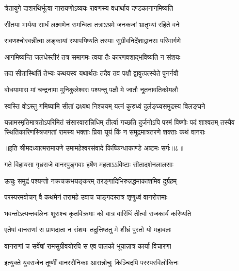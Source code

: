 \twolineshloka
{त्रेतायुगे दाशरथिर्भूत्वा नारायणोऽव्ययः}
{रावणस्य वधार्थाय दण्डकानागमिष्यति} %

\twolineshloka
{सीतया भार्यया सार्धं लक्ष्मणेन समन्वितः}
{तत्राऽश्रमे जनकजां भ्रातृभ्यां रहिते वने} %

\twolineshloka
{रावणश्चोरवन्नीत्वा लङ्कायां स्थापयिष्यति}
{तस्याः सुग्रीवनिर्देशाद्वानराः परिमार्गणे} %

\twolineshloka
{आगमिष्यन्ति जलधेस्तीरं तत्र समागमः}
{त्वया तैः कारणवशाद्भविष्यति न संशयः} %

\twolineshloka
{तदा सीतास्थितिं तेभ्यः कथयस्व यथार्थतः}
{तदैव तव पक्षौ द्वावुत्पत्स्येते पुनर्नवौ} %


\twolineshloka
{बोधयामास मां चन्द्रनामा मुनिकुलेश्वरः}
{पश्यन्तु पक्षौ मे जातौ नूतनावतिकोमलौ} %

\twolineshloka
{स्वस्ति वोऽस्तु गमिष्यामि सीतां द्रक्ष्यथ निश्चयम्}
{यत्नं कुरुध्वं दुर्लङ्घ्यसमुद्रस्य विलङ्घने} %

\fourlineindentedshloka
{यन्नामस्मृतिमात्रतोऽपरिमितं संसारवारान्निधिम्}
{तीर्त्वा गच्छति दुर्जनोऽपि परमं विष्णोः पदं शाश्वतम्}
{तस्यैव स्थितिकारिणस्त्रिजगतां रामस्य भक्ताः प्रिया}
{यूयं किं न समुद्रमात्रतरणे शक्ताः कथं वानराः} %

{॥इति श्रीमदध्यात्मरामायणे उमामहेश्वरसंवादे किष्किन्धाकाण्डे
अष्टमः सर्गः॥८॥}





\twolineshloka
{गते विहायसा गृध्रराजे वानरपुङ्गवाः}
{हर्षेण महताऽऽविष्टाः सीतादर्शनलालसाः} %

\twolineshloka
{ऊचुः समुद्रं पश्यन्तो नक्रचक्रभयङ्करम्}
{तरङ्गादिभिरुन्नद्धमाकाशमिव दुर्ग्रहम्} %

\twolineshloka
{परस्परमवोचन् वै कथमेनं तरामहे}
{उवाच चाङ्गदस्तत्र शृणुध्वं वानरोत्तमाः} %

\twolineshloka
{भवन्तोऽत्यन्तबलिनः शूराश्च कृतविक्रमाः}
{को वात्र वारिधिं तीर्त्वा राजकार्यं करिष्यति} %

\twolineshloka
{एतेषां वानराणां स प्राणदाता न संशयः}
{तदुत्तिष्ठतु मे शीघ्रं पुरतो यो महाबलः} %

\twolineshloka
{वानराणां च सर्वेषां रामसुग्रीवयोरपि}
{स एव पालको भूयान्नात्र कार्या विचारणा} %

\twolineshloka
{इत्युक्ते युवराजेन तूष्णीं वानरसैनिकाः}
{आसन्नोचुः किञ्चिदपि परस्परविलोकिनः} %

